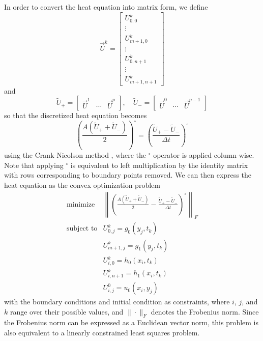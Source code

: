 \documentclass[conference]{IEEEtran}
\begin{document}
In order to convert the heat equation into matrix form, we define
\begin{equation}
  \vec{U}^k = \begin{bmatrix}
    U_{0,0}^k \\ \vdots \\ U_{m+1,0}^k \\ \vdots \\ U_{0,n+1}^k \\ \vdots \\ U_{m+1,n+1}^k
  \end{bmatrix}
\end{equation}
and
\begin{equation}
  \widetilde{U}_+ = \begin{bmatrix}
    \vec{U}^1 & \cdots & \vec{U}^p
  \end{bmatrix}, \quad \widetilde{U}_- = \begin{bmatrix}
    \vec{U}^0 & \cdots & \vec{U}^{p-1}
  \end{bmatrix}
\end{equation}
so that the discretized heat equation becomes
\begin{equation}
  \left(\frac{A(\widetilde{U}_+ + \widetilde{U}_-)}{2}\right)^\circ = \left(\frac{\widetilde{U}_+ - \widetilde{U}_-}{\Delta t}\right)^\circ
\end{equation}
using the Crank-Nicolson method \cite{cn}, where the ${}^\circ$ operator is applied column-wise. Note that applying ${}^\circ$ is equivalent to left multiplication by the identity matrix with rows corresponding to boundary points removed. We can then express the heat equation as the convex optimization problem
\begin{equation}
  \begin{array}{lll}
    \text{minimize} & \left\|\left(\frac{A(\widetilde{U}_+ + \widetilde{U}_-)}{2} - \frac{\widetilde{U}_+ - \widetilde{U}_-}{\Delta t}\right)^\circ\right\|_F \\
    \text{subject to} & U_{0,j}^k = g_0(y_j, t_k) \\
    & U_{m+1,j}^k = g_1(y_j, t_k) \\
    & U_{i,0}^k = h_0(x_i, t_k) \\
    & U_{i,n+1}^k = h_1(x_i, t_k) \\
    & U_{i,j}^0 = u_0(x_i, y_j)
  \end{array}
\end{equation}
with the boundary conditions and initial condition as constraints, where $i$, $j$, and $k$ range over their possible values, and $\|\cdot\|_F$ denotes the Frobenius norm. Since the Frobenius norm can be expressed as a Euclidean vector norm, this problem is also equivalent to a linearly constrained least squares problem.
\end{document}
